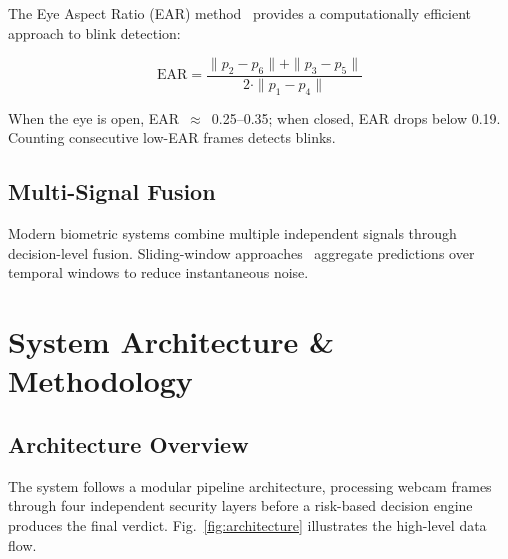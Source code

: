 \documentclass[conference,10pt]{IEEEtran}
\begin{document}
The Eye Aspect Ratio (EAR) method~\cite{soukupova2016} provides a computationally efficient approach to blink detection:

\begin{equation}
    \text{EAR} = \frac{\|p_2 - p_6\| + \|p_3 - p_5\|}{2 \cdot \|p_1 - p_4\|}
\end{equation}

When the eye is open, EAR~$\approx$~0.25--0.35; when closed, EAR drops below 0.19. Counting consecutive low-EAR frames detects blinks.

\subsection{Multi-Signal Fusion}

Modern biometric systems combine multiple independent signals through decision-level fusion. Sliding-window approaches~\cite{ross2006} aggregate predictions over temporal windows to reduce instantaneous noise.


\section{System Architecture \& Methodology}

\subsection{Architecture Overview}

The system follows a modular pipeline architecture, processing webcam frames through four independent security layers before a risk-based decision engine produces the final verdict. Fig.~\ref{fig:architecture} illustrates the high-level data flow.
\end{document}
